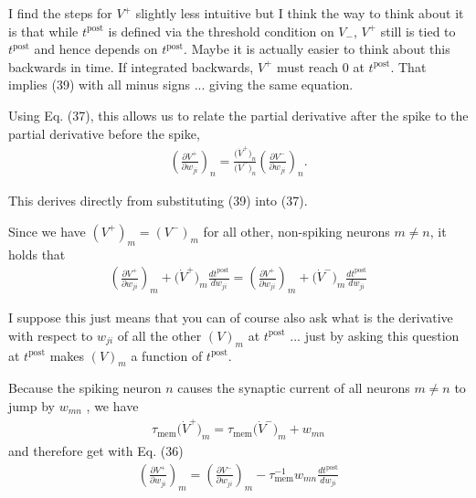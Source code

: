 \documentclass[a4paper]{article}
\newcommand{\blue}[1]{{\color{blue}#1}}
\begin{document}
I find the steps for $V^+$ slightly less intuitive but I think the
way to think about it is that while $t^{\text{post}}$ is defined
via the threshold condition on $V_-$, $V^+$ still is tied to
$t^{\text{post}}$ and hence depends on $t^{\text{post}}$. Maybe it
is actually easier to think about this backwards in time. If
integrated backwards, $V^+$ must reach $0$ at
$t^{\text{post}}$. That implies \blue{(39)} with all minus signs
... giving the same equation.

\blue{Using Eq. (37), this allows us to relate the partial derivative after the spike to the partial derivative before
  the spike,
  \begin{align}
    \left(\frac{\partial V^+}{\partial w_{ji}}\right)_n =
    \frac{\big(\dot{V}^+\big)_n}{\big(\dot{V}^-\big)_n}
    \left(\frac{\partial V^-}{\partial w_{ji}}\right)_n . \tag{40}
  \end{align}
}

This derives directly from substituting \blue{(39)} into \blue{(37)}.

\blue{
  Since we have $(V^+)_m = (V^-)_m$ for all other, non-spiking
  neurons $m \neq n$, it holds that
  \begin{align}
    \left(\frac{\partial V^+}{\partial w_{ji}}\right)_m + \big(
    \dot{V}^+\big)_m \frac{d t^{\text{post}}}{d w_{ji}} =
    \left(\frac{\partial V^+}{\partial w_{ji}}\right)_m + \big(
    \dot{V}^-\big)_m \frac{d t^{\text{post}}}{d w_{ji}} \tag{41}
  \end{align}
}

I suppose this just means that you can of course also ask what is the
derivative with respect to $w_{ji}$ of all the other $(V)_m$ at
$t^{\text{post}}$ ... just by asking this question at
$t^{\text{post}}$ makes $(V)_m$ a function of $t^{\text{post}}$.
    
\blue{
  Because the spiking neuron $n$ causes the synaptic current of all neurons $m \neq n$ to jump by $w_{mn}$ , we have
  \begin{align}
    \tau_{\text{mem}} \big(\dot{V}^+\big)_m = \tau_{\text{mem}}
    \big(\dot{V}^-\big)_m +w_{mn} \tag{42}
  \end{align}
  and therefore get with Eq. (36)
  \begin{align}
    \left(\frac{\partial V^+}{\partial w_{ji}}\right)_m =
    \left(\frac{\partial V^-}{\partial w_{ji}}\right)_m -
    \tau_{\text{mem}}^{-1} w_{mn} \frac{d t^{\text{post}}}{dw_{ji}}
    \tag{43} 
  \end{align}
  }
\end{document}
